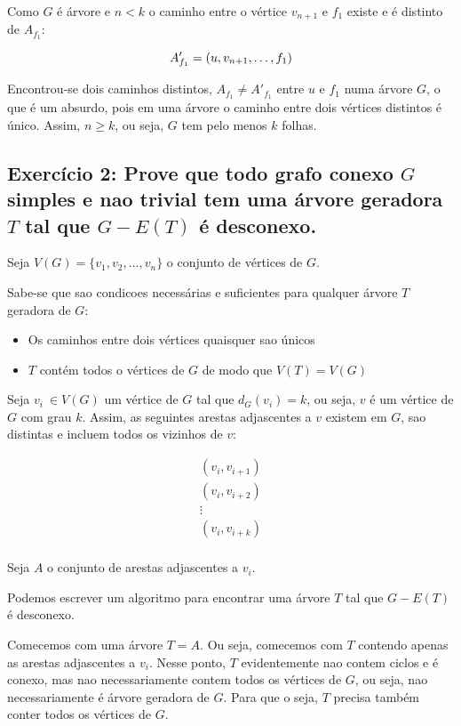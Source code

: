 \documentclass{article}
\begin{document}
Como $G$ é árvore e $n < k$ o caminho entre o vértice $v_{n+1}$ e $f_1$ existe e é distinto de $A_{f_1}$:

$$
A'_{f_1} = (u, v_{n+1}, \ldots, f_1) \\
$$


Encontrou-se dois caminhos distintos, $A_{f_1} \neq A'_{f_1}$ entre $u$ e $f_1$ numa árvore $G$, o que é um absurdo, pois em uma árvore o caminho entre dois vértices distintos é único. Assim, $n \geq k$, ou seja, $G$ tem pelo menos $k$ folhas.

\clearpage


\subsection{Exercício 2: Prove que todo grafo conexo $G$ simples e nao trivial tem uma árvore geradora $T$ tal que $G - E(T)$ é desconexo.}


Seja $V(G) = \{ v_1, v_2, \ldots, v_n\}$ o conjunto de vértices de $G$. 

Sabe-se que sao condicoes necessárias e suficientes para qualquer árvore $T$ geradora de $G$:

\begin{itemize}
	\item Os caminhos entre dois vértices quaisquer sao únicos 
	\item $T$ contém todos o vértices de $G$ de modo que $V(T) = V(G)$
\end{itemize}  

Seja $v_i \ \in V(G)$ um vértice de $G$ tal que $d_G(v_i) = k$, ou seja, $v$ é um  vértice de $G$ com grau $k$. 
Assim, as seguintes arestas adjascentes a $v$ existem em $G$, sao distintas e incluem todos os vizinhos de $v$:

\begin{align*}
	(v_i, v_{i+1}) \\ 
	(v_i, v_{i+2}) \\ 
	\vdots \\
	(v_i, v_{i+k}) \\ 
\end{align*}

Seja $A$ o conjunto de arestas adjascentes a $v_i$.

Podemos escrever um algoritmo para encontrar uma árvore $T$ tal que $G - E(T)$ é desconexo. 

Comecemos com uma árvore $T = A$. Ou seja, comecemos com $T$ contendo apenas as arestas adjascentes a $v_i$. Nesse ponto, $T$  evidentemente nao contem ciclos e é conexo, mas nao necessariamente contem todos os vértices de $G$, ou seja, nao necessariamente é árvore geradora de $G$. Para que o seja, $T$ precisa também conter todos os vértices de $G$.
\end{document}
